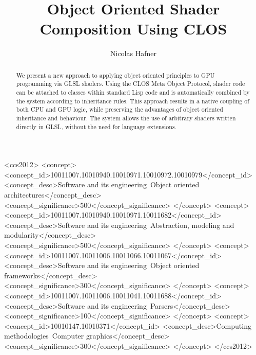 \documentclass[format=sigconf]{acmart}
\begin{document}
\title{Object Oriented Shader Composition Using CLOS}

\author{Nicolas Hafner}

\begin{abstract}
  We present a new approach to applying object oriented principles to GPU programming via GLSL shaders. Using the CLOS Meta Object Protocol, shader code can be attached to classes within standard Lisp code and is automatically combined by the system according to inheritance rules. This approach results in a native coupling of both CPU and GPU logic, while preserving the advantages of object oriented inheritance and behaviour. The system allows the use of arbitrary shaders written directly in GLSL, without the need for language extensions.
\end{abstract}

\begin{CCSXML}
  <ccs2012>
  <concept>
  <concept_id>10011007.10010940.10010971.10010972.10010979</concept_id>
  <concept_desc>Software and its engineering~Object oriented architectures</concept_desc>
  <concept_significance>500</concept_significance>
  </concept>
  <concept>
  <concept_id>10011007.10010940.10010971.10011682</concept_id>
  <concept_desc>Software and its engineering~Abstraction, modeling and modularity</concept_desc>
  <concept_significance>500</concept_significance>
  </concept>
  <concept>
  <concept_id>10011007.10011006.10011066.10011067</concept_id>
  <concept_desc>Software and its engineering~Object oriented frameworks</concept_desc>
  <concept_significance>300</concept_significance>
  </concept>
  <concept>
  <concept_id>10011007.10011006.10011041.10011688</concept_id>
  <concept_desc>Software and its engineering~Parsers</concept_desc>
  <concept_significance>100</concept_significance>
  </concept>
  <concept>
  <concept_id>10010147.10010371</concept_id>
  <concept_desc>Computing methodologies~Computer graphics</concept_desc>
  <concept_significance>300</concept_significance>
  </concept>
  </ccs2012>
\end{CCSXML}

\end{document}
